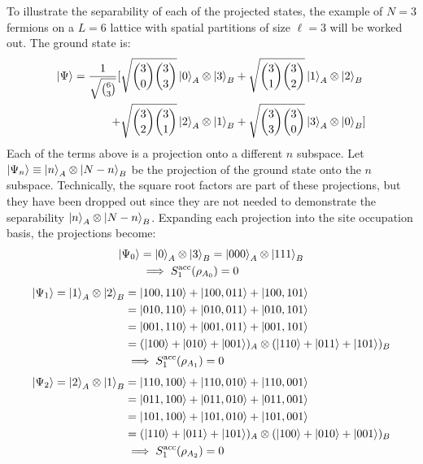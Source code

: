 To illustrate the separability of each of the projected states, the example of $N=3$ fermions on a $L=6$ lattice with spatial partitions of size $\ell=3$ will be worked out. The ground state is:
%
\begin{align}
\ket{\Psi} = \frac{1}{\sqrt{{{6}\choose{3}}}} [ &\sqrt{{{3}\choose{0}}{{3}\choose{3}}} \ket{0}_A \otimes \ket{3}_B + \sqrt{{{3}\choose{1}}{{3}\choose{2}}} \ket{1}_A \otimes \ket{2}_B \nonumber \\
+ &\sqrt{{{3}\choose{2}}{{3}\choose{1}}} \ket{2}_A \otimes \ket{1}_B +\sqrt{{{3}\choose{3}}{{3}\choose{0}}} \ket{3}_A \otimes \ket{0}_B ] 
\end{align}
%
Each of the terms above is a projection onto a different $n$ subspace. Let $\ket{\Psi_n} \equiv \ket{n}_A \otimes \ket{N-n}_B$ be the projection of the ground state onto the $n$ subspace. Technically, the square root factors are part of these projections, but they have been dropped out since they are not needed to demonstrate the separability $\ket{n}_A \otimes \ket{N-n}_B$. Expanding each projection into the site occupation basis, the projections become:
%
\begin{align}
\ket{\Psi_0} &=  \ket{0}_A \otimes \ket{3}_B = \ket{000}_A\otimes\ket{111}_B \nonumber \\
&\implies S_1^{\rm acc}(\rho_{A_{0}}) = 0
\end{align}
%
%
\begin{align}
\ket{\Psi_1} =  \ket{1}_A \otimes \ket{2}_B &= \ket{100,110} + \ket{100,011} + \ket{100,101} \nonumber \\
&= \ket{010,110} + \ket{010,011} + \ket{010,101} \nonumber \\
&= \ket{001,110} + \ket{001,011} + \ket{001,101} \nonumber \\
&= (\ket{100} + \ket{010} + \ket{001})_A \otimes (\ket{110} + \ket{011} + \ket{101})_B \nonumber \\
&\implies S_1^{\rm acc}(\rho_{A_{1}}) = 0
\end{align}
%
%
\begin{align}
\ket{\Psi_2} =  \ket{2}_A \otimes \ket{1}_B &= \ket{110,100} + \ket{110,010} + \ket{110,001} \nonumber \\
&= \ket{011,100} + \ket{011,010} + \ket{011,001} \nonumber \\
&= \ket{101,100} + \ket{101,010} + \ket{101,001} \nonumber \\
&= (\ket{110} + \ket{011} + \ket{101})_A \otimes (\ket{100} + \ket{010} + \ket{001})_B \nonumber \\
&\implies S_1^{\rm acc}(\rho_{A_{2}}) = 0
\end{align}
